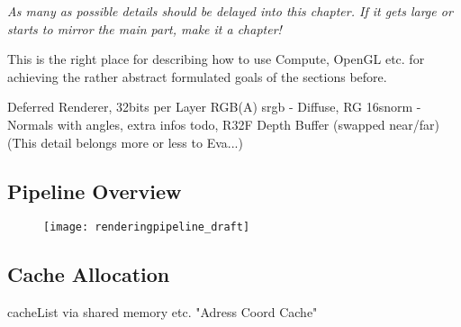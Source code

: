 \documentclass[thesis.tex]{subfiles}
\begin{document}
\emph{As many as possible details should be delayed into this chapter. If it gets large or starts to mirror the main part, make it a chapter!}

This is the right place for describing how to use Compute, OpenGL etc. for achieving the rather abstract formulated goals of the sections before.

Deferred Renderer, 32bits per Layer RGB(A) srgb - Diffuse, RG 16snorm - Normals with angles, extra infos todo, R32F Depth Buffer (swapped near/far)\\
(This detail belongs more or less to Eva...)

\subsection{Pipeline Overview}

\begin{figure}[h]
	\centering
	\texttt{[image: renderingpipeline\_draft]}
\end{figure}



\subsection{Cache Allocation}
cacheList via shared memory etc.
"Adress Coord Cache"

\subfilebib %
\end{document}
